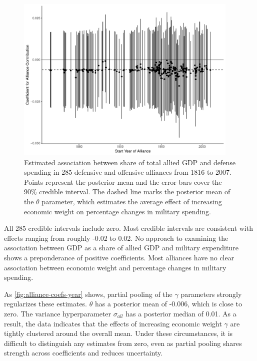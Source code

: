 \documentclass[12pt]{article}
\begin{document}
\begin{figure}[htbp]
	\centering
		\includegraphics[width=0.95\textwidth]{alliance-coefs-year.pdf}
	\caption{Estimated association between share of total allied GDP and defense spending in 285 defensive and offensive alliances from 1816 to 2007. Points represent the posterior mean and the error bars cover the 90\% credible interval. The dashed line marks the posterior mean of the $\theta$ parameter, which estimates the average effect of increasing economic weight on percentage changes in military spending.}
	\label{fig:alliance-coefs-year}
\end{figure}


All 285 credible intervals include zero. 
Most credible intervals are consistent with effects ranging from roughly -0.02 to 0.02. 
No approach to examining the association between GDP as a share of allied GDP and military expenditure shows a preponderance of positive coefficients. 
Most alliances have no clear association between economic weight and percentage changes in military spending.


As \autoref{fig:alliance-coefs-year} shows, partial pooling of the $\gamma$ parameters strongly regularizes these estimates. 
$\theta$ has a posterior mean of -0.006, which is close to zero. 
The variance hyperparameter $\sigma_{all}$ has a posterior median of 0.01. 
As a result, the data indicates that the effects of increasing economic weight $\gamma$ are tightly clustered around the overall mean. 
Under these circumstances, it is difficult to distinguish any estimates from zero, even as partial pooling shares strength across coefficients and reduces uncertainty. 
\end{document}
